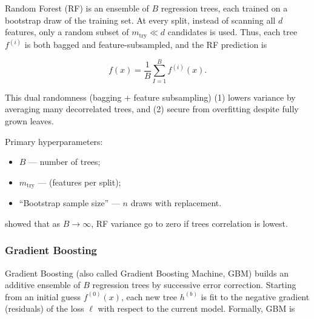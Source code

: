\documentclass{article}
\begin{document}
Random Forest (RF) is an ensemble of \(B\) regression trees\cite{breimanRandomForests2001}, each trained on a bootstrap draw of the training set. At every split, instead of scanning all \(d\) features, only a random subset of \(m_{\mathrm{try}}\ll d\) candidates is used. Thus, each tree \(f^{(i)}\) is both bagged and feature-subsampled, and the RF prediction is

\begin{equation}
    f(x)
    =
    \frac{1}{B}\sum_{I=1}^B f^{(i)}(x).
\end{equation}

This dual randomness (bagging + feature subsampling) (1) lowers variance by averaging many decorrelated trees, and (2) secure from overfitting despite fully grown leaves.

Primary hyperparameters:
\begin{itemize}
    \item \(B\) --- number of trees;
    \item \(m_{\mathrm{try}}\) --- (features per split);
    \item ``Bootstrap sample size'' --- \(n\) draws with replacement.
\end{itemize}

\cite{breimanRandomForests2001} showed that as \(B \to \infty\), RF variance go to zero if trees correlation is lowest.



\subsubsection{Gradient Boosting}
\label{model:gradient-boosting}

Gradient Boosting (also called Gradient Boosting Machine, GBM) \cite{friedmanGreedyFunctionApproximation2001} builds an additive ensemble of \(B\) regression trees by successive error correction. Starting from an initial guess \(f^{(0)}(x)\), each new tree \(h^{(b)}\) is fit to the negative gradient (residuals) of the loss \(\ell\) with respect to the current model. Formally, GBM is
\end{document}
